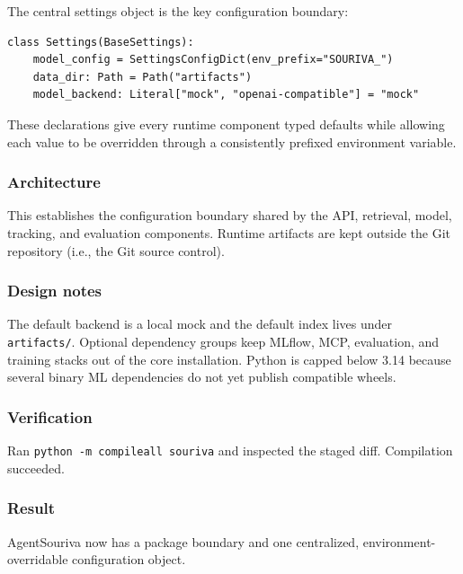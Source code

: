 The central settings object is the key configuration boundary:

\begin{verbatim}
class Settings(BaseSettings):
    model_config = SettingsConfigDict(env_prefix="SOURIVA_")
    data_dir: Path = Path("artifacts")
    model_backend: Literal["mock", "openai-compatible"] = "mock"
\end{verbatim}

These declarations give every runtime component typed defaults while allowing each value to be overridden through a consistently prefixed environment variable.

\subsubsection{Architecture}

This establishes the configuration boundary shared by the API, retrieval, model, tracking, and evaluation components. Runtime artifacts are kept outside the Git repository (i.e., the Git source control).

\subsubsection{Design notes}

The default backend is a local mock and the default index lives under \texttt{artifacts/}. Optional dependency groups keep MLflow, MCP, evaluation, and training stacks out of the core installation. Python is capped below 3.14 because several binary ML dependencies do not yet publish compatible wheels.

\subsubsection{Verification}

Ran \texttt{python\ -m\ compileall\ souriva} and inspected the staged diff. Compilation succeeded.

\subsubsection{Result}

AgentSouriva now has a package boundary and one centralized, environment-overridable configuration object.

